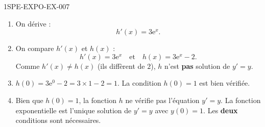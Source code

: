 \begin{corrige}{1SPE-EXPO-EX-007}
\begin{enumerate}
\item On dérive :
\[h'(x) = 3\mathrm{e}^x.\]

\item On compare $h'(x)$ et $h(x)$ :
\[h'(x) = 3\mathrm{e}^x \quad \text{et} \quad h(x) = 3\mathrm{e}^x - 2.\]
Comme $h'(x)
\neq h(x)$ (ils diffèrent de $2$), $h$ n'est \textbf{pas} solution de $y' = y$.

\item $h(0) = 3\mathrm{e}^0 - 2 = 3 \times 1 - 2 = 1$.
La condition $h(0) = 1$ est bien vérifiée.

\item Bien que $h(0) = 1$, la fonction $h$ ne vérifie pas l'équation $y' = y$. La fonction exponentielle est l'unique solution de $y' = y$ avec $y(0) = 1$. Les \textbf{deux} conditions sont nécessaires.
\end{enumerate}
\end{corrige}
